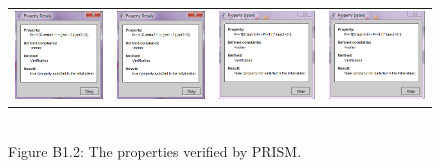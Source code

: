 \documentclass[12pt]{report}
\begin{document}
\begin{figure}[H]
			\centering
			\begin{tabular}{ l c c r }
				\includegraphics[scale=0.5]{../GFX/A1-1b-client2.png}
				& \includegraphics[scale=0.5]{../GFX/A1-1b-client2.png}
				& \includegraphics[scale=0.5]{../GFX/A2-2-PFCFS.png}
				& \includegraphics[scale=0.5]{../GFX/A2-2-PFCFS.png}
			\end{tabular}\\
			Figure B1.2: The properties verified by PRISM.
		\end{figure}
\end{document}
